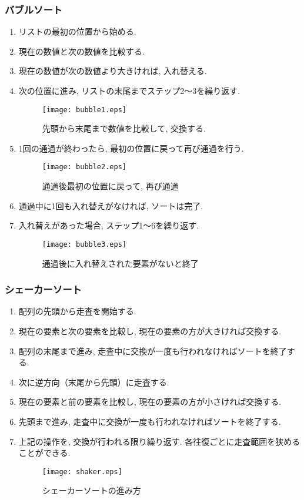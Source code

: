 \documentclass[a4j, 11pt]{jarticle}
\begin{document}
\subsubsection{バブルソート}
\begin{enumerate}
  \item リストの最初の位置から始める. 
  \item 現在の数値と次の数値を比較する. 
  \item 現在の数値が次の数値より大きければ, 入れ替える. 
  \item 次の位置に進み, リストの末尾までステップ2〜3を繰り返す. 
  \begin{figure}[H]
    \centering
    \texttt{[image: bubble1.eps]}
    \caption{先頭から末尾まで数値を比較して, 交換する. }
  \end{figure}
  \item 1回の通過が終わったら, 最初の位置に戻って再び通過を行う. 
  \begin{figure}[H]
    \centering
    \texttt{[image: bubble2.eps]}
    \caption{通過後最初の位置に戻って, 再び通過}
  \end{figure}
  \item 通過中に1回も入れ替えがなければ, ソートは完了. 
  \item 入れ替えがあった場合, ステップ1〜6を繰り返す. 
  \begin{figure}[H]
    \centering
    \texttt{[image: bubble3.eps]}
    \caption{通過後に入れ替えされた要素がないと終了}
  \end{figure}
\end{enumerate}
\subsubsection{シェーカーソート}
\begin{enumerate}
  \item 配列の先頭から走査を開始する. 
  \item 現在の要素と次の要素を比較し, 現在の要素の方が大きければ交換する. 
  \item 配列の末尾まで進み, 走査中に交換が一度も行われなければソートを終了する. 
  \item 次に逆方向（末尾から先頭）に走査する. 
  \item 現在の要素と前の要素を比較し, 現在の要素の方が小さければ交換する. 
  \item 先頭まで進み, 走査中に交換が一度も行われなければソートを終了する. 
  \item 上記の操作を, 交換が行われる限り繰り返す. 各往復ごとに走査範囲を狭めることができる. 
  \begin{figure}[H]
    \centering
    \texttt{[image: shaker.eps]}
    \caption{シェーカーソートの進み方}
  \end{figure}
\end{enumerate}
\newpage
\end{document}
